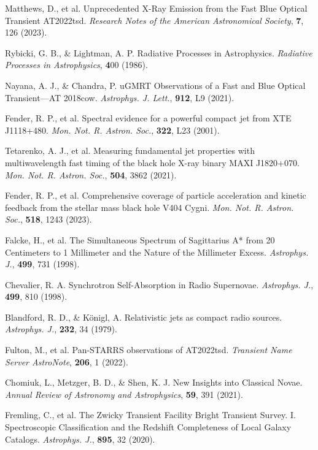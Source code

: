 \documentclass{nature_plusfigure}
\newcommand{\mn}{{Mon. Not. R. Astron. Soc.}}
\newcommand{\mnras}{\mn}
\newcommand{\apj}{{Astrophys. J.}}
\newcommand{\apjl}{{Astrophys. J. Lett.}}
\newcommand{\araa}{Annual Review of Astronomy and Astrophysics}
\begin{document}
\begin{methods}
\begin{thebibliography}{10}
  Matthews, D., et al. Unprecedented X-Ray Emission from the Fast Blue Optical Transient AT2022tsd. \emph{Research Notes of the American Astronomical Society}, \textbf{7}, 126 (2023). 

 Rybicki, G. B., \& Lightman, A. P. Radiative Processes in Astrophysics. \emph{Radiative Processes in Astrophysics}, \textbf 400 (1986). 

 Nayana, A. J., \& Chandra, P. uGMRT Observations of a Fast and Blue Optical Transient—AT 2018cow. \emph{\apjl}, \textbf{912}, L9 (2021). 

 Fender, R. P., et al. Spectral evidence for a powerful compact jet from XTE J1118+480. \emph{\mnras}, \textbf{322}, L23 (2001).

 Tetarenko, A. J., et al. Measuring fundamental jet properties with multiwavelength fast timing of the black hole X-ray binary MAXI J1820+070. \emph{\mnras}, \textbf{504}, 3862 (2021).  

  Fender, R. P., et al. Comprehensive coverage of particle acceleration and kinetic feedback from the stellar mass black hole V404 Cygni. \emph{\mnras}, \textbf{518}, 1243 (2023). 
 
  Falcke, H., et al. The Simultaneous Spectrum of Sagittarius A* from 20 Centimeters to 1 Millimeter and the Nature of the Millimeter Excess. \emph{\apj}, \textbf{499}, 731 (1998). 

 Chevalier, R. A. Synchrotron Self-Absorption in Radio Supernovae. \emph{\apj}, \textbf{499}, 810 (1998). 

  Blandford, R. D., \& Königl, A. Relativistic jets as compact radio sources. \emph{\apj}, \textbf{232}, 34 (1979). 


 Fulton, M., et al. Pan-STARRS observations of AT2022tsd. \emph{Transient Name Server AstroNote}, \textbf{206}, 1 (2022). 

 Chomiuk, L., Metzger, B. D., \& Shen, K. J. New Insights into Classical Novae. \emph{\araa}, \textbf{59}, 391 (2021). 

 Fremling, C., et al. The Zwicky Transient Facility Bright Transient Survey. I. Spectroscopic Classification and the Redshift Completeness of Local Galaxy Catalogs. \emph{\apj}, \textbf{895}, 32 (2020).


\end{thebibliography}
\end{methods}
\end{document}
